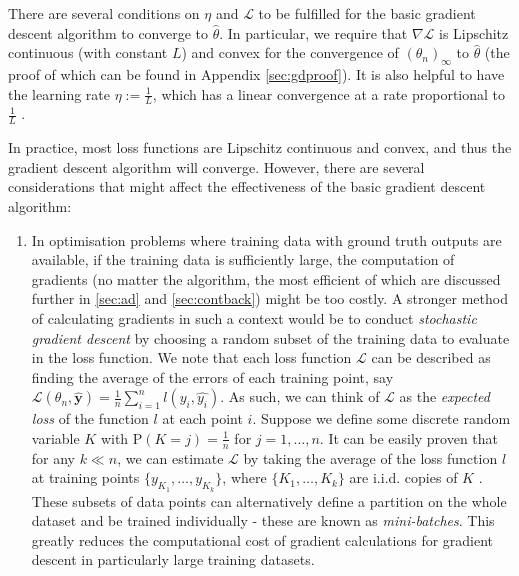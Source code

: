 \documentclass[a4paper,11pt,titlepage]{article}
\theoremstyle{definition}
\theoremstyle{plain}
\theoremstyle{remark}
\begin{document}
There are several conditions on $\eta$ and $\mathcal{L}$ to be fulfilled for the basic gradient descent algorithm to converge to $\hat{\theta}$. In particular, we require that $\nabla\mathcal{L}$ is Lipschitz continuous (with constant $L$) and convex for the convergence of $(\theta_n)_\infty$ to $\hat{\theta}$ (the proof of which can be found in Appendix \ref{sec:gdproof}). It is also helpful to have the learning rate $\eta := \frac{1}{L}$, which has a linear convergence at a rate proportional to $\frac{1}{L}$ \cite{gower2015}.

In practice, most loss functions are Lipschitz continuous and convex, and thus the gradient descent algorithm will converge. However, there are several considerations that might affect the effectiveness of the basic gradient descent algorithm:
\begin{enumerate}
    \item In optimisation problems where training data with ground truth outputs are available, if the training data is sufficiently large, the computation of gradients (no matter the algorithm, the most efficient of which are discussed further in \ref{sec:ad} and \ref{sec:contback}) might be too costly. A stronger method of calculating gradients in such a context would be to conduct \textit{stochastic gradient descent} by choosing a random subset of the training data to evaluate in the loss function. We note that each loss function $\mathcal{L}$ can be described as finding the average of the errors of each training point, say $\mathcal{L}(\theta_n,\mathbf{\hat{y}}) = \frac{1}{n} \sum_{i=1}^n l(y_i, \hat{y_i})$. As such, we can think of $\mathcal{L}$ as the \textit{expected loss} of the function $l$ at each point $i$. Suppose we define some discrete random variable $K$ with $\mathrm{P}(K = j) = \frac{1}{n}$ for $j = 1, \dots, n$. It can be easily proven that for any $k \ll n$, we can estimate $\mathcal{L}$ by taking the average of the loss function $l$ at training points $\{y_{K_1}, \dots, y_{K_k}\}$, where $\{K_1, \dots, K_k\}$ are i.i.d. copies of $K$ \cite{kroese2019}. These subsets of data points can alternatively define a partition on the whole dataset and be trained individually - these are known as \textit{mini-batches}. This greatly reduces the computational cost of gradient calculations for gradient descent in particularly large training datasets. 
    

\end{enumerate}
\end{document}
